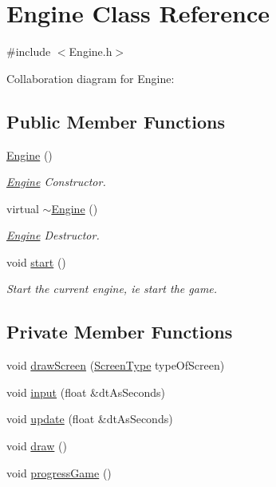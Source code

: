 \hypertarget{class_engine}{}\section{Engine Class Reference}
\label{class_engine}


{\ttfamily \#include $<$Engine.\+h$>$}



Collaboration diagram for Engine\+:
\subsection*{Public Member Functions}
\begin{DoxyCompactItemize}
\item 
\hyperlink{class_engine_a8c98683b0a3aa28d8ab72a8bcd0d52f2}{Engine} ()
\begin{DoxyCompactList}\small\item\em \hyperlink{class_engine}{Engine} Constructor. \end{DoxyCompactList}\item 
virtual \hyperlink{class_engine_a8ef7030a089ecb30bbfcb9e43094717a}{$\sim$\+Engine} ()
\begin{DoxyCompactList}\small\item\em \hyperlink{class_engine}{Engine} Destructor. \end{DoxyCompactList}\item 
void \hyperlink{class_engine_a4d8066dd213a03f5420d1bf60f150ca7}{start} ()
\begin{DoxyCompactList}\small\item\em Start the current engine, ie start the game. \end{DoxyCompactList}\end{DoxyCompactItemize}
\subsection*{Private Member Functions}
\begin{DoxyCompactItemize}
\item 
void \hyperlink{class_engine_a19be6708b8b65c5cfd8c13305f1e3c7f}{draw\+Screen} (\hyperlink{_engine_8h_a9f5ff9109158e83287c5c888bf7bb8a7}{Screen\+Type} type\+Of\+Screen)
\item 
void \hyperlink{class_engine_aa59920acbc4379a9672265904bc08b98}{input} (float \&dt\+As\+Seconds)
\item 
void \hyperlink{class_engine_af40c099ae4c70e308303ef5220ee9052}{update} (float \&dt\+As\+Seconds)
\item 
void \hyperlink{class_engine_a1b654dc41dfbcb5072147f33142b726e}{draw} ()
\item 
void \hyperlink{class_engine_a54ab8f7be8ce000f7bd83a98d41d6b98}{progress\+Game} ()
\end{DoxyCompactItemize}
